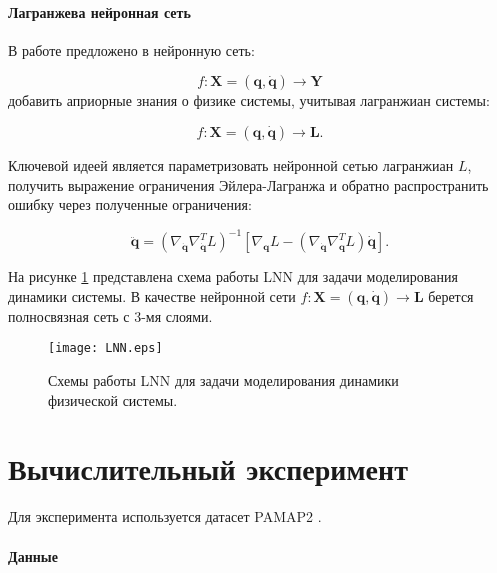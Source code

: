 \documentclass[12pt, twoside]{article}
\begin{document}
    \paragraph{Лагранжева нейронная сеть}

        В работе \cite{cranmer2020lagrangian} предложено в нейронную сеть:

        $$f: \mathbf{X} = (\mathbf{q}, \mathbf{\dot{q}}) \rightarrow \mathbf{Y}$$
        добавить априорные знания о физике системы, учитывая лагранжиан системы:
    
        $$f: \mathbf{X} = (\mathbf{q}, \mathbf{\dot{q}}) \rightarrow \mathbf{L}.$$

        Ключевой идеей является параметризовать нейронной сетью лагранжиан $L$, получить выражение ограничения Эйлера-Лагранжа и обратно распространить ошибку через полученные ограничения:
    
        $$\ddot{\mathbf{q}} = \left( \nabla_{\dot{\mathbf{q}}} \nabla_{\dot{\mathbf{q}}}^T L \right)^{-1} \left[ \nabla_{\mathbf{q}} L - \left( \nabla_{\dot{\mathbf{q}}} \nabla_{\mathbf{q}}^T L \right) \dot{\mathbf{q}} \right].$$

        На рисунке \ref{fig: LNN} представлена схема работы LNN для задачи моделирования динамики системы. В качестве нейронной сети $f: \mathbf{X} = (\mathbf{q}, \mathbf{\dot{q}}) \rightarrow \mathbf{L}$ берется полносвязная сеть с 3-мя слоями.

        \begin{figure}[H]
            \centering
            \texttt{[image: LNN.eps]}
            \caption{Схемы работы LNN для задачи моделирования динамики физической системы.}
            \label{fig: LNN}
        \end{figure}
    
\section{Вычислительный эксперимент}

    Для эксперимента используется датасет PAMAP2 \cite{PAMAP2}.

    \paragraph{Данные}
    
\end{document}
